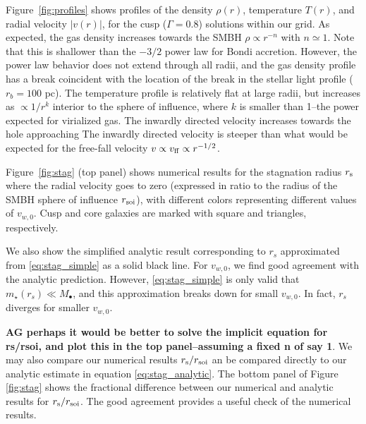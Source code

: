 \documentclass[usenatbib,fleqn]{mn2e}
\newcommand{\rs}{r_s}
\newcommand{\rb}{r_b}
\newcommand{\Mstar}{m_{\star}}
\newcommand{\Mbh}[1][]{M_{\bullet#1}}
\newcommand{\vwO}{v_{w,0}}
\begin{document}
Figure~\ref{fig:profiles} shows profiles of the density $\rho(r)$,
temperature $T(r)$, and radial velocity $|v(r)|$, for the cusp
($\Gamma=0.8$) solutions within our grid.  As expected, the gas
density increases towards the SMBH $\rho\propto r^{-n}$ with
$n\simeq1$.  Note that this is shallower than the $-3/2$ power law for
Bondi accretion. However, the power law behavior does not extend
through all radii, and the gas density profile has a break coincident
with the location of the break in the stellar light profile ($\rb=100$
pc). The temperature profile is relatively flat at large radii, but
increases as $\propto 1/r^{k}$ interior to the sphere of influence,
where $k$ is smaller than 1--the power expected for virialized gas.
The inwardly directed velocity increases towards the hole approaching
The inwardly directed velocity is steeper than what would be expected
for the free-fall velocity $v \propto v_{\rm ff}\propto r^{-1/2}$.


Figure~\ref{fig:stag} (top panel) shows numerical results for the
stagnation radius $r_{\rm s}$ where the radial velocity goes to zero
(expressed in ratio to the radius of the SMBH sphere of influence
$r_{\rm soi}$), with different colors representing different values of
$v_{w,0}$.  Cusp and core galaxies are marked with square and
triangles, respectively.

We also show the simplified analytic result corresponding to $\rs$
approximated from \eqref{eq:stag_simple} as a solid black line. For
$\vwO$, we find good agreement with the analytic prediction. However,
\eqref{eq:stag_simple} is only valid that $\Mstar(\rs) \ll \Mbh$, and
this approximation breaks down for small $\vwO$. In fact, $\rs$
diverges for smaller $\vwO$. 

{\bf AG perhaps it would be better to solve the implicit equation for
  rs/rsoi, and plot this in the top panel--assuming a fixed n of say
  1}. We may also compare our numerical results $r_{\rm s}/r_{\rm
  soi}$ an be compared directly to our analytic estimate in equation
\ref{eq:stag_analytic}.  The bottom panel of Figure \ref{fig:stag}
shows the fractional difference between our numerical and analytic
results for $r_{\rm s}/r_{\rm soi}$.  The good agreement provides a
useful check of the numerical results.
\end{document}

